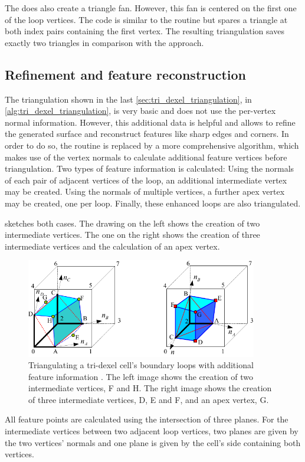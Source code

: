 The  does also create a triangle fan.
However, this fan is centered on the first one of the loop vertices.
The code is similar to the  routine but spares a triangle at both index pairs containing the first vertex.
The resulting triangulation saves exactly two triangles in comparison with the  approach.


\subsection{Refinement and feature reconstruction}
\label{sec:tri_dexel_refinement}

The triangulation shown in the last \cref{sec:tri_dexel_triangulation},  in \cref{alg:tri_dexel_triangulation}, is very basic and does not use the per-vertex normal information.
However, this additional data is helpful and allows to refine the generated surface and reconstruct features like sharp edges and corners.
In order to do so, the  routine is replaced by a more comprehensive algorithm, which makes use of the vertex normals to calculate additional feature vertices before triangulation.
Two types of feature information is calculated:
Using the normals of each pair of adjacent vertices of the loop, an additional intermediate vertex may be created.
Using the normals of multiple vertices, a further apex vertex may be created, one per loop.
Finally, these enhanced loops are also triangulated.

 sketches both cases.
The drawing on the left shows the creation of two intermediate vertices.
The one on the right shows the creation of three intermediate vertices and the calculation of an apex vertex.
%
\begin{figure}
	\centering
	\includegraphics[width=0.9\textwidth]{images/tri_dexel_refinement}
	\caption[Feature reconstruction]{
		Triangulating a tri-dexel cell's boundary loops with additional feature information \cite{tridexel_reconstruction}.
		The left image shows the creation of two intermediate vertices, F and H.
		The right image shows the creation of three intermediate vertices, D, E and F, and an apex vertex, G.
	}
	\label{fig:tri_dexel_refinement}
\end{figure}
%
All feature points are calculated using the intersection of three planes.
For the intermediate vertices between two adjacent loop vertices, two planes are given by the two vertices' normals and one plane is given by the cell's side containing both vertices.

